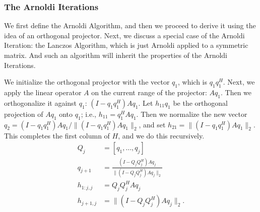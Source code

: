 \documentclass[]{article}
\theoremstyle{definition}
\begin{document}
        \subsubsection{The Arnoldi Iterations}
            We first define the Arnoldi Algorithm, and then we proceed to derive it using the idea of an orthogonal projector. Next, we discuss a special case of the Arnoldi Iteration: the Lanczos Algorithm, which is just Arnoldi applied to a symmetric matrix. And such an algorithm will inherit the properties of the Arnoldi Iterations. 
            \par
            We initialize the orthogonal projector with the vector $q_1$, which is $q_1q_1^H$.  Next, we apply the linear operator $A$ on the current range of the projector: $Aq_1$.  Then we orthogonalize it against $q_1$:  $(I - q_1 q_1^H ) A q_1$.  Let $h_{11} q_1$ be the orthogonal projection of $A q_1$ onto $q_1$; i.e., $h_{11} = q_1^H A q_1$.  Then we normalize the new vector $q_2 = (I - q_1 q_1^H ) A q_1 / \| (I - q_1 q_1^H ) A q_1 \|_2$, and set
            $h_{21} = \| (I - q_1 q_1^H ) A q_1 \|_2$.  
            This completes the first column of $H$, and we do this recursively. 
            \begin{align}
                Q_j &= [ q_1 , \ldots , q_j ]
                \\
                q_{ j + 1} &= \frac{(I - Q_j Q_j^H)Aq_j}{\| (I - Q_j Q_j^H ) A q_j \|_2}
                \\
                h_{1:j, j} &= Q_j Q_j^H Aq_j 
                \\
                h_{j+1,j} &= \| (I - Q_j Q_j^H ) A q_j \|_2 .
            \end{align}
\end{document}
